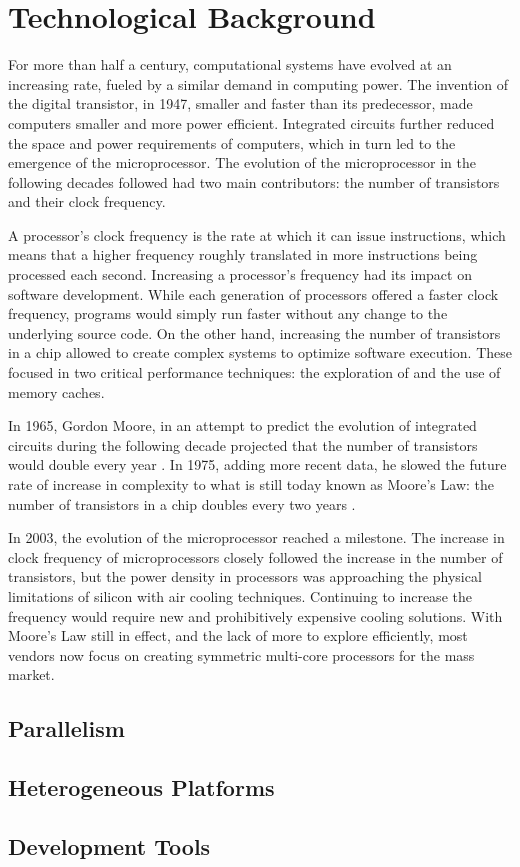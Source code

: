 \documentclass[../thesis]{subfiles}
\begin{document}
	\chapter{Technological Background}
	For more than half a century, computational systems have evolved at an increasing rate, fueled by a similar demand in computing power. The invention of the digital transistor, in 1947, smaller and faster than its predecessor, made computers smaller and more power efficient. Integrated circuits further reduced the space and power requirements of computers, which in turn led to the emergence of the microprocessor. The evolution of the microprocessor in the following decades followed had two main contributors: the number of transistors and their clock frequency.

	A processor's clock frequency is the rate at which it can issue instructions, which means that a higher frequency roughly translated in more instructions being processed each second. Increasing a processor's frequency had its impact on software development. While each generation of processors offered a faster clock frequency, programs would simply run faster without any change to the underlying source code. On the other hand, increasing the number of transistors in a chip allowed to create complex systems to optimize software execution. These focused in two critical performance techniques: the exploration of \ilp and the use of memory caches.

	In 1965, Gordon Moore, in an attempt to predict the evolution of integrated circuits during the following decade projected that the number of transistors would double every year \cite{Moore:1965}. In 1975, adding more recent data, he slowed the future rate of increase in complexity to what is still today known as Moore's Law: the number of transistors in a chip doubles every two years \cite{Moore:1975,ComputerHistory:Moore}.

	In 2003, the evolution of the microprocessor reached a milestone. The increase in clock frequency of microprocessors closely followed the increase in the number of transistors, but the power density in processors was approaching the physical limitations of silicon with air cooling techniques. Continuing to increase the frequency would require new and prohibitively expensive cooling solutions. With Moore's Law still in effect, and the lack of more \ilp to explore efficiently, most vendors now focus on creating symmetric multi-core processors for the mass market.

		\section{Parallelism}
		\section{Heterogeneous Platforms}
		\section{Development Tools}
\end{document}
